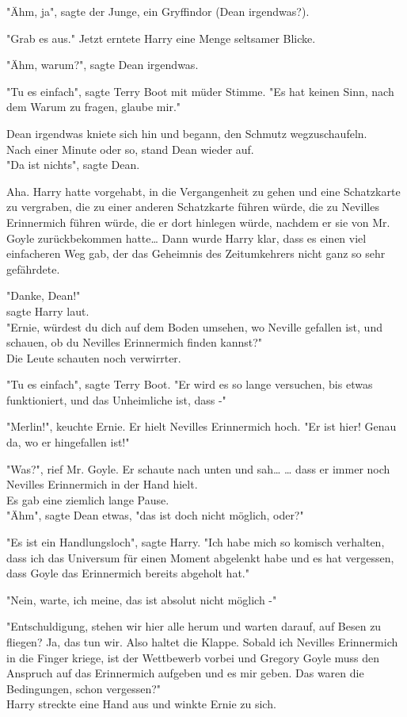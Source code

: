 {"Ähm, ja", sagte der Junge, ein Gryffindor (Dean irgendwas?).

"Grab es aus." Jetzt erntete Harry eine Menge seltsamer Blicke.

"Ähm, warum?", sagte Dean irgendwas.

"Tu es einfach", sagte Terry Boot mit müder Stimme. "Es hat keinen Sinn, nach dem Warum zu fragen, glaube mir."

Dean irgendwas kniete sich hin und begann, den Schmutz wegzuschaufeln.\\ Nach einer Minute oder so, stand Dean wieder auf.\\ "Da ist nichts", sagte Dean.

Aha. Harry hatte vorgehabt, in die Vergangenheit zu gehen und eine Schatzkarte zu vergraben, die zu einer anderen Schatzkarte führen würde, die zu Nevilles Erinnermich führen würde, die er dort hinlegen würde, nachdem er sie von Mr. Goyle zurückbekommen hatte… Dann wurde Harry klar, dass es einen viel einfacheren Weg gab, der das Geheimnis des Zeitumkehrers nicht ganz so sehr gefährdete.

"Danke, Dean!"\\ sagte Harry laut.\\ "Ernie, würdest du dich auf dem Boden umsehen, wo Neville gefallen ist, und schauen, ob du Nevilles Erinnermich finden kannst?"\\ Die Leute schauten noch verwirrter.

"Tu es einfach", sagte Terry Boot. "Er wird es so lange versuchen, bis etwas funktioniert, und das Unheimliche ist, dass -"

"Merlin!", keuchte Ernie. Er hielt Nevilles Erinnermich hoch. "Er ist hier! Genau da, wo er hingefallen ist!"

"Was?", rief Mr. Goyle. Er schaute nach unten und sah… … dass er immer noch Nevilles Erinnermich in der Hand hielt.\\ Es gab eine ziemlich lange Pause.\\ "Ähm", sagte Dean etwas, "das ist doch nicht möglich, oder?"

"Es ist ein Handlungsloch", sagte Harry. "Ich habe mich so komisch verhalten, dass ich das Universum für einen Moment abgelenkt habe und es hat vergessen, dass Goyle das Erinnermich bereits abgeholt hat."

"Nein, warte, ich meine, das ist absolut nicht möglich -"

"Entschuldigung, stehen wir hier alle herum und warten darauf, auf Besen zu fliegen? Ja, das tun wir. Also haltet die Klappe. Sobald ich Nevilles Erinnermich in die Finger kriege, ist der Wettbewerb vorbei und Gregory Goyle muss den Anspruch auf das Erinnermich aufgeben und es mir geben. Das waren die Bedingungen, schon vergessen?"\\ Harry streckte eine Hand aus und winkte Ernie zu sich.

}
